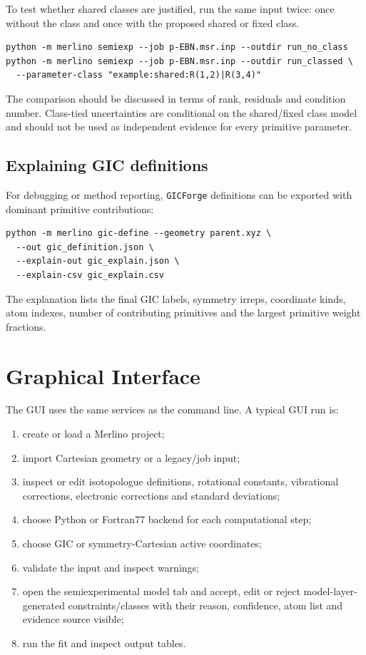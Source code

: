 \documentclass[11pt]{article}
\newcommand{\gicforge}{\texttt{GICForge}}
\begin{document}
To test whether shared classes are justified, run the same input twice: once
without the class and once with the proposed shared or fixed class.

\begin{lstlisting}[style=merlino]
python -m merlino semiexp --job p-EBN.msr.inp --outdir run_no_class
python -m merlino semiexp --job p-EBN.msr.inp --outdir run_classed \
  --parameter-class "example:shared:R(1,2)|R(3,4)"
\end{lstlisting}

\noindent
The comparison should be discussed in terms of rank, residuals and condition
number.  Class-tied uncertainties are conditional on the shared/fixed class
model and should not be used as independent evidence for every primitive
parameter.

\subsection{Explaining GIC definitions}

For debugging or method reporting, \gicforge{} definitions can be exported with
dominant primitive contributions:

\begin{lstlisting}[style=merlino]
python -m merlino gic-define --geometry parent.xyz \
  --out gic_definition.json \
  --explain-out gic_explain.json \
  --explain-csv gic_explain.csv
\end{lstlisting}

\noindent
The explanation lists the final GIC labels, symmetry irreps, coordinate kinds,
atom indexes, number of contributing primitives and the largest primitive
weight fractions.

\section{Graphical Interface}

The GUI uses the same services as the command line.  A typical GUI run is:

\begin{enumerate}
  \item create or load a Merlino project;
  \item import Cartesian geometry or a legacy/job input;
  \item inspect or edit isotopologue definitions, rotational constants,
        vibrational corrections, electronic corrections and standard
        deviations;
  \item choose Python or Fortran77 backend for each computational step;
  \item choose GIC or symmetry-Cartesian active coordinates;
  \item validate the input and inspect warnings;
  \item open the semiexperimental model tab and accept, edit or reject model-layer-generated
        constraints/classes with their reason, confidence, atom list and
        evidence source visible;
  \item run the fit and inspect output tables.
\end{enumerate}
\end{document}
